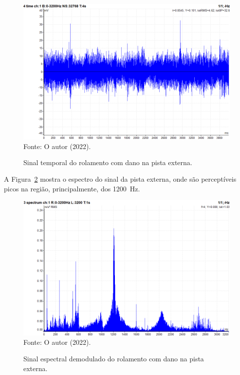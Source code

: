 \documentclass[
	12pt,				
	oneside,			
	a4paper,			
	english,			
	brazil,			
	]{abntex2ppgsi}
\begin{document}
\begin{figure}[H]
\centering
\caption {Sinal temporal do rolamento com dano na pista externa.}
\includegraphics[width=\textwidth,keepaspectratio]{TEMPO_DEFEITO_EXTERNA_100HZ_COM_CARGA} \\
Fonte: O autor (2022).
\label{TEMPO_DEFEITO_EXTERNA_100HZ_COM_CARGA}
\end{figure}

A Figura~\ref{ESPECTRO_DEFEITO_EXTERNA_100HZ} mostra o espectro do sinal da pista externa, onde são perceptíveis picos na região, principalmente, dos \SI{1200}{\hertz}.  

\begin{figure}[H]
\centering
\caption {Sinal espectral demodulado do rolamento com dano na pista externa.}
\includegraphics[width=\textwidth,keepaspectratio]{ESPECTRO_DEFEITO_EXTERNA_100HZ} \\
Fonte: O autor (2022).
\label{ESPECTRO_DEFEITO_EXTERNA_100HZ}
\end{figure}
  
\end{document}
